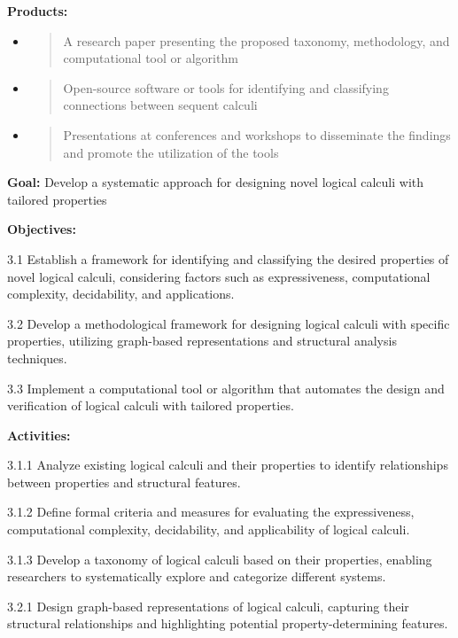 \textbf{Products:}

\begin{itemize}
\item
  \begin{quote}
  A research paper presenting the proposed taxonomy, methodology, and
  computational tool or algorithm
  \end{quote}
\item
  \begin{quote}
  Open-source software or tools for identifying and classifying
  connections between sequent calculi
  \end{quote}
\item
  \begin{quote}
  Presentations at conferences and workshops to disseminate the findings
  and promote the utilization of the tools
  \end{quote}
\end{itemize}

\textbf{Goal:} Develop a systematic approach for designing novel logical
calculi with tailored properties

\textbf{Objectives:}

3.1 Establish a framework for identifying and classifying the desired
properties of novel logical calculi, considering factors such as
expressiveness, computational complexity, decidability, and
applications.

3.2 Develop a methodological framework for designing logical calculi
with specific properties, utilizing graph-based representations and
structural analysis techniques.

3.3 Implement a computational tool or algorithm that automates the
design and verification of logical calculi with tailored properties.

\textbf{Activities:}

3.1.1 Analyze existing logical calculi and their properties to identify
relationships between properties and structural features.

3.1.2 Define formal criteria and measures for evaluating the
expressiveness, computational complexity, decidability, and
applicability of logical calculi.

3.1.3 Develop a taxonomy of logical calculi based on their properties,
enabling researchers to systematically explore and categorize different
systems.

3.2.1 Design graph-based representations of logical calculi, capturing
their structural relationships and highlighting potential
property-determining features.

